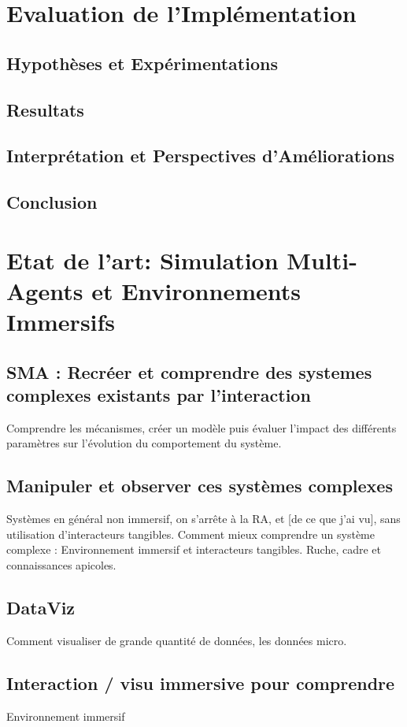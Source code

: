 \documentclass[11pt,a4paper]{report}
\begin{document}
\chapter{Evaluation de l'Implémentation}
	\section{Hypothèses et Expérimentations}
	\section{Resultats}
	\section{Interprétation et Perspectives d'Améliorations}
			
	\section*{Conclusion}


\chapter{Etat de l'art: Simulation Multi-Agents et Environnements Immersifs}
	\section{SMA : Recréer et comprendre des systemes complexes existants par l'interaction}
		Comprendre les mécanismes, créer un modèle puis évaluer l'impact des différents paramètres sur l'évolution du comportement du système.
	\section{Manipuler et observer ces systèmes complexes}
		Systèmes en général non immersif, on s'arrête à la RA, et [de ce que j'ai vu], sans utilisation d'interacteurs tangibles.
	Comment mieux comprendre un système complexe : Environnement immersif et interacteurs tangibles. Ruche, cadre et connaissances apicoles.
	\section{DataViz}
		Comment visualiser de grande quantité de données, les données micro.
	\section{Interaction / visu immersive pour comprendre}
		Environnement immersif
\end{document}
